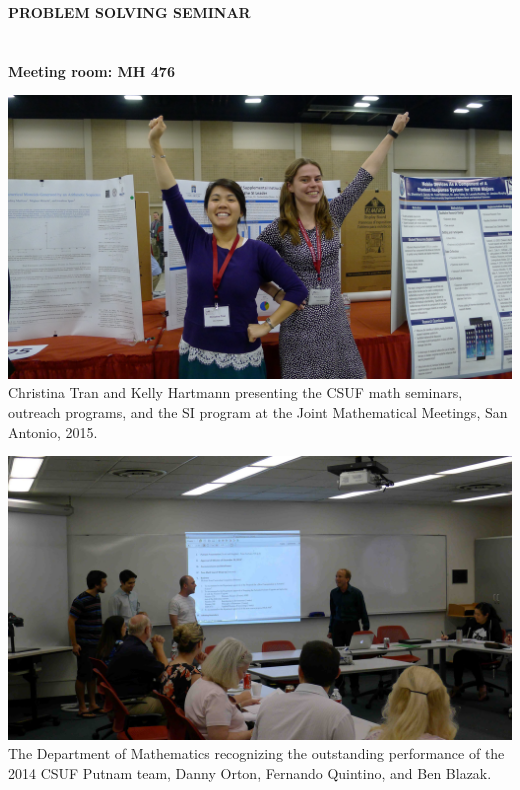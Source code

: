 \documentclass[a4paper]{article}
\begin{document}
\thispagestyle{empty}


\newcommand{\name}[1]{\textit{#1}}

\raggedbottom
\begin{minipage}{0.95\textwidth}
\sffamily
\centering
\LARGE{\color{csecondary}\bf PROBLEM SOLVING SEMINAR}\\

\Large{\color{cprimary}\textbf{}}\\

\large{\color{cprimary}\textbf{}}\\
\smallskip
\large{\color{cprimary}\textbf{{\color{csecondary}Meeting room:} MH 476}}

\bigskip

\begin{minipage}[b]{0.47\textwidth}
\normalsize
\includegraphics[width=\linewidth]{SanAntonio.jpg}
Christina Tran and Kelly Hartmann presenting the CSUF math seminars, outreach programs, and the SI program at the Joint Mathematical Meetings, San Antonio, 2015.
\medskip\par
\includegraphics[width=\linewidth]{Ben.jpg}
The Department of Mathematics recognizing the outstanding performance of the 2014 CSUF Putnam team, Danny Orton, Fernando Quintino, and Ben Blazak.
\medskip
\medskip


\end{minipage}
\end{minipage}
\end{document}
